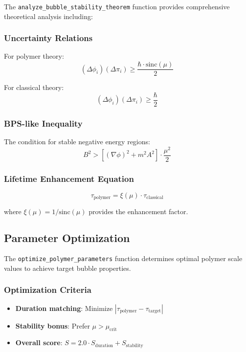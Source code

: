 The \texttt{analyze\_bubble\_stability\_theorem} function provides comprehensive theoretical analysis including:

\subsubsection{Uncertainty Relations}

For polymer theory:
\begin{equation}
(\Delta\phi_i)(\Delta\pi_i) \geq \frac{\hbar \cdot \text{sinc}(\mu)}{2}
\end{equation}

For classical theory:
\begin{equation}
(\Delta\phi_i)(\Delta\pi_i) \geq \frac{\hbar}{2}
\end{equation}

\subsubsection{BPS-like Inequality}

The condition for stable negative energy regions:
\begin{equation}
B^2 > \left[(\nabla\phi)^2 + m^2A^2\right] \cdot \frac{\mu^2}{2}
\end{equation}

\subsubsection{Lifetime Enhancement Equation}

\begin{equation}
\tau_{\text{polymer}} = \xi(\mu) \cdot \tau_{\text{classical}}
\end{equation}

where $\xi(\mu) = 1/\text{sinc}(\mu)$ provides the enhancement factor.

\subsection{Parameter Optimization}

The \texttt{optimize\_polymer\_parameters} function determines optimal polymer scale values to achieve target bubble properties.

\subsubsection{Optimization Criteria}

\begin{itemize}
\item \textbf{Duration matching}: Minimize $|\tau_{\text{polymer}} - \tau_{\text{target}}|$
\item \textbf{Stability bonus}: Prefer $\mu > \mu_{\text{crit}}$
\item \textbf{Overall score}: $S = 2.0 \cdot S_{\text{duration}} + S_{\text{stability}}$
\end{itemize}

